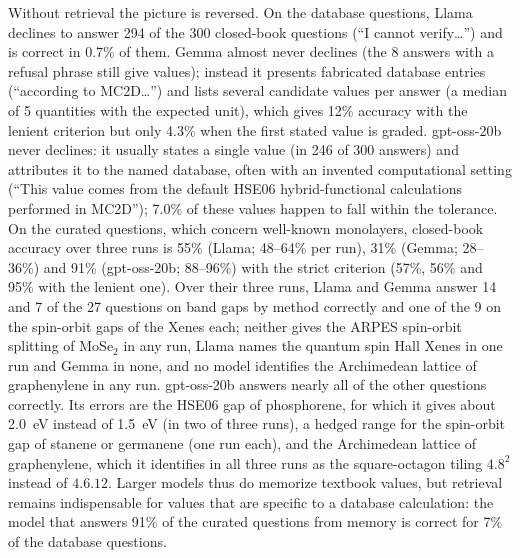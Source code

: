 \documentclass[prmaterials,twocolumn,superscriptaddress,longbibliography,nofootinbib]{revtex4-2}
\begin{document}
Without retrieval the picture is reversed. On the database questions, Llama declines to
answer 294 of the 300 closed-book questions (``I cannot verify\ldots'') and is correct in
0.7\% of them. Gemma almost never declines (the 8 answers with a refusal phrase still give
values); instead it presents fabricated database entries (``according to MC2D\ldots'') and
lists several candidate values per answer (a median of 5 quantities with the expected unit),
which gives 12\% accuracy with the lenient criterion but only 4.3\% when the first stated
value is graded. gpt-oss-20b never declines: it usually states a single value (in 246 of 300
answers) and attributes it to the named database, often with an invented computational
setting (``This value comes from the default HSE06 hybrid-functional calculations performed
in MC2D''); 7.0\% of these values happen to fall within the tolerance. On the curated
questions, which concern well-known monolayers, closed-book accuracy over three runs is 55\%
(Llama; 48--64\% per run), 31\% (Gemma; 28--36\%) and 91\% (gpt-oss-20b; 88--96\%) with the
strict criterion (57\%, 56\% and 95\% with the lenient one). Over their three runs, Llama and
Gemma answer 14 and 7 of the 27 questions on band gaps by method correctly and one of the 9
on the spin-orbit gaps of the Xenes each; neither gives the ARPES spin-orbit splitting of
MoSe$_2$ in any run, Llama names the quantum spin Hall Xenes in one run and Gemma in none,
and no model identifies the Archimedean lattice of graphenylene in any run. gpt-oss-20b
answers nearly all of the other questions correctly. Its errors are the HSE06 gap of phosphorene, for which it gives about
2.0~eV instead of 1.5~eV (in two of three runs), a hedged range for the spin-orbit gap of
stanene or germanene (one run each), and the Archimedean lattice of graphenylene, which it
identifies in all three runs as the square-octagon tiling $4.8^2$ instead of $4.6.12$.
Larger models thus do memorize textbook values, but retrieval remains indispensable for
values that are specific to a database calculation: the model that answers 91\% of the
curated questions from memory is correct for 7\% of the database questions.
\end{document}
